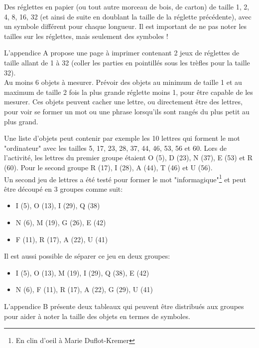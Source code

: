 \documentclass[a4paper,12pt]{scrartcl}
\begin{document}
Des réglettes en papier (ou tout autre morceau de bois, de carton) de taille 1, 2, 4, 8, 16, 32 (et ainsi de suite en doublant la taille de la réglette précédente), avec un symbole différent pour chaque longueur. Il est important de ne pas noter les tailles sur les réglettes, mais seulement des symboles !

L'appendice A propose une page à imprimer contenant 2 jeux de réglettes de taille allant de 1 à 32 (coller les parties en pointillés sous les trèfles pour la taille 32).\\


Au moins 6 objets à mesurer. Prévoir des objets au minimum de taille 1 et au maximum de taille 2 fois la plus grande réglette moins 1, pour être capable de les mesurer.
%
Ces objets peuvent cacher une lettre, ou directement être des lettres, pour voir se former un mot ou une phrase lorsqu'ils sont rangés du plus petit au plus grand.

Une liste d'objets peut contenir par exemple les 10 lettres qui forment le mot "ordinateur" avec les tailles 5, 17, 23, 28, 37, 44, 46, 53, 56 et 60.
%
Lors de l'activité, les lettres du premier groupe étaient O (5), D (23), N (37), E (53) et R (60). Pour le second groupe R (17), I (28), A (44), T (46) et U (56).\\


Un second jeu de lettres a été testé pour former le mot "informagique"\footnote{En clin d'oeil à Marie Duflot-Kremer} et peut être découpé en 3 groupes comme suit:
\begin{itemize}
    \item I (5), O (13), I (29), Q (38)
    \item N (6), M (19), G (26), E (42)
    \item F (11), R (17), A (22), U (41)
\end{itemize}
\medskip
Il est aussi possible de séparer ce jeu en deux groupes:
\begin{itemize}
    \item I (5), O (13), M (19), I (29), Q (38), E (42)
    \item N (6), F (11), R (17), A (22), G (29), U (41)
\end{itemize}

\bigskip
L'appendice B présente deux tableaux qui peuvent être distribués aux groupes pour aider à noter la taille des objets en termes de symboles.



\end{document}
